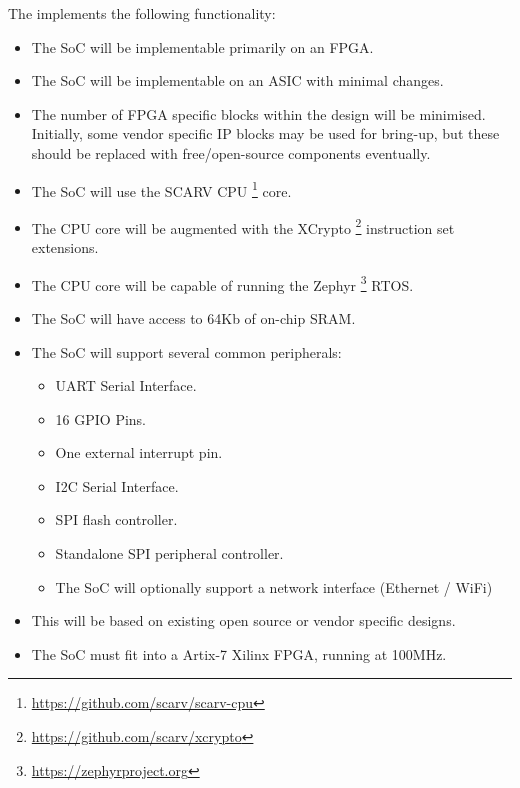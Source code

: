
The \SCARVSOC implements the following functionality:

\begin{itemize}

\item  The SoC will be implementable primarily on an FPGA.

\item The SoC will be implementable on an ASIC with minimal changes.

\item The number of FPGA specific blocks within the design will be minimised.
    Initially, some vendor specific IP blocks may be used for bring-up, but
    these should be replaced with free/open-source components eventually.

\item The SoC will use the SCARV CPU
    \footnote{\url{https://github.com/scarv/scarv-cpu}}
    core.

\item The CPU core will be augmented with the XCrypto
    \footnote{\url{https://github.com/scarv/xcrypto}}
    instruction set extensions.

\item The CPU core will be capable of running the Zephyr
    \footnote{\url{https://zephyrproject.org}}
    RTOS.

\item The SoC will have access to 64Kb of on-chip SRAM.

\item The SoC will support several common peripherals:

\begin{itemize}

\item UART Serial Interface.

\item 16 GPIO Pins.

\item One external interrupt pin.
\item I2C Serial Interface.
\item SPI flash controller.
\item Standalone SPI peripheral controller.

\item The SoC will optionally support a network interface (Ethernet / WiFi)

\end{itemize}

\item This will be based on existing open source or vendor specific designs.

\item The SoC must fit into a Artix-7 Xilinx FPGA, running at 100MHz.


\end{itemize}

